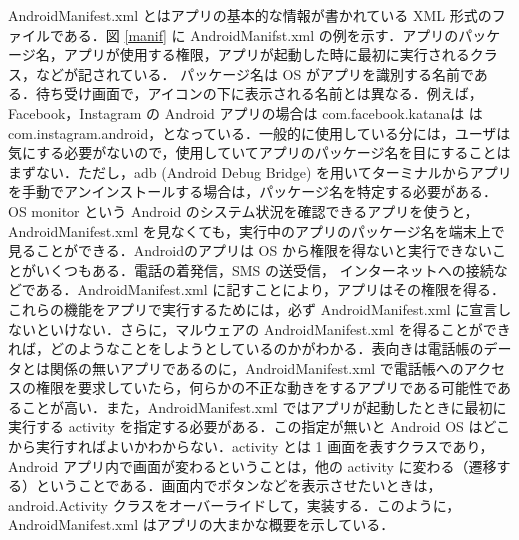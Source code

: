 \documentclass[12pt]{jsarticle}
\begin{document}
AndroidManifest.xml とはアプリの基本的な情報が書かれている XML 形式のファイルである．図 \ref{manif} に AndroidManifst.xml の例を示す．アプリのパッケージ名，アプリが使用する権限，アプリが起動した時に最初に実行されるクラス，などが記されている． パッケージ名は OS がアプリを識別する名前である．待ち受け画面で，アイコンの下に表示される名前とは異なる．例えば，Facebook，Instagram の Android アプリの場合は com.facebook.katanaは  は com.instagram.android，となっている．一般的に使用している分には，ユーザは気にする必要がないので，使用していてアプリのパッケージ名を目にすることはまずない．ただし，adb (Android Debug Bridge) を用いてターミナルからアプリを手動でアンインストールする場合は，パッケージ名を特定する必要がある．OS monitor という Android のシステム状況を確認できるアプリを使うと，AndroidManifest.xml を見なくても，実行中のアプリのパッケージ名を端末上で見ることができる．Androidのアプリは OS から権限を得ないと実行できないことがいくつもある．電話の着発信，SMS の送受信， インターネットへの接続などである．AndroidManifest.xml に記すことにより，アプリはその権限を得る．これらの機能をアプリで実行するためには，必ず AndroidManifest.xml に宣言しないといけない．さらに，マルウェアの AndroidManifest.xml を得ることができれば，どのようなことをしようとしているのかがわかる．表向きは電話帳のデータとは関係の無いアプリであるのに，AndroidManifest.xml で電話帳へのアクセスの権限を要求していたら，何らかの不正な動きをするアプリである可能性であることが高い．また，AndroidManifest.xml ではアプリが起動したときに最初に実行する activity を指定する必要がある．この指定が無いと Android OS はどこから実行すればよいかわからない．activity とは 1 画面を表すクラスであり，Android アプリ内で画面が変わるということは，他の activity に変わる（遷移する）ということである．画面内でボタンなどを表示させたいときは，android.Activity クラスをオーバーライドして，実装する．このように，AndroidManifest.xml はアプリの大まかな概要を示している．
\end{document}
